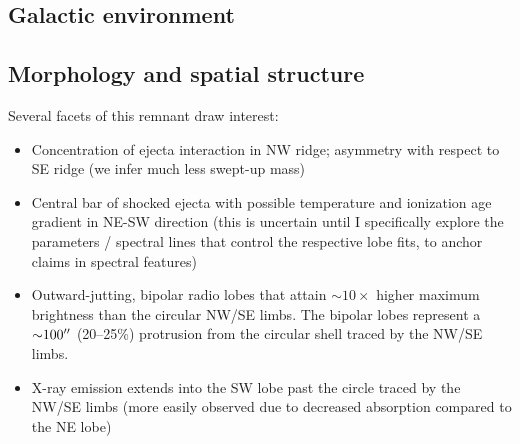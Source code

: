 \documentclass[twocolumn,tighten,trackchanges]{aastex61}
\newcommand*{\mt}{\mathrm}
\newcommand*{\unit}[1]{\;\mt{#1}}  %
\newcommand*{\abt}{\mathord{\sim}} %
\newcommand*{\Gsnr}{G309.2$-$0.6}
\begin{document}
\subsection{Galactic environment}



\subsection{Morphology and spatial structure}

Several facets of this remnant draw interest:
\begin{itemize}
    \item Concentration of ejecta interaction in NW ridge; asymmetry with
        respect to SE ridge (we infer much less swept-up mass)
    \item Central bar of shocked ejecta with possible temperature and
        ionization age gradient in NE-SW direction (this is uncertain until I
        specifically explore the parameters / spectral lines that control the
        respective lobe fits, to anchor claims in spectral features)
    \item Outward-jutting, bipolar radio lobes that attain $\abt10\times$
        higher maximum brightness than the circular NW/SE limbs.
        The bipolar lobes represent a $\abt 100\arcsec$ (20--25\%) protrusion
        from the circular shell traced by the NW/SE limbs.
    \item X-ray emission extends into the SW lobe past the circle traced by
        the NW/SE limbs (more easily observed due to decreased absorption
        compared to the NE lobe)
\end{itemize}
\end{document}
